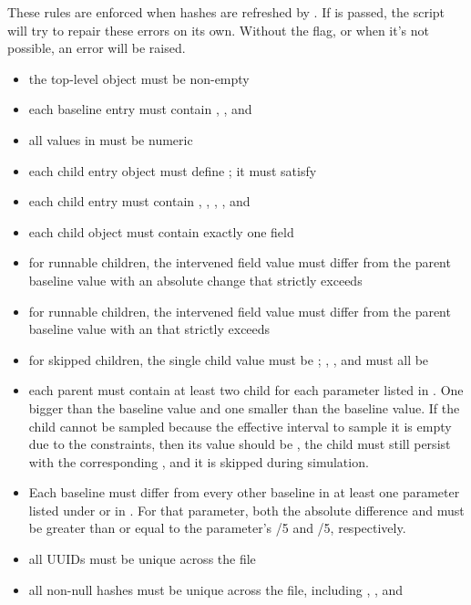 \documentclass[11pt]{article}
\begin{document}
These rules are enforced when hashes are refreshed by .
If  is passed, the script will try to repair these errors on its own. 
Without the flag, or when it's not possible, an error will be raised.
\begin{itemize}
\item the top-level object must be non-empty
\item each baseline entry must contain , , and 
\item all values in  must be numeric
\item each child entry object must define ; it must satisfy 
\item each child entry must contain , , , , and 
\item each child  object must contain exactly one field
\item for runnable children, the intervened field value must differ from the parent baseline value with an absolute change that strictly exceeds \termMinAbsDist
\item for runnable children, the intervened field value must differ from the parent baseline value with an \termSRD that strictly exceeds \termMinSRDDistance
\item for skipped children, the single child value must be ; , , and  must all be 
\item each parent must contain at least two child for each parameter listed in . 
One bigger than the baseline value and one smaller than the baseline value. If the child cannot be sampled because the effective interval to sample it is empty due to the constraints, then its value should be , the child must still persist with the corresponding , and it is skipped during simulation.
\item Each baseline must differ from every other baseline in at least one parameter listed under  or in .
For that parameter, both the absolute difference and \termSRD must be greater than or equal to the parameter's /5 and /5, respectively.
\item all UUIDs must be unique across the file
\item all non-null hashes must be unique across the file, including , , and 
\end{itemize}
\end{document}
